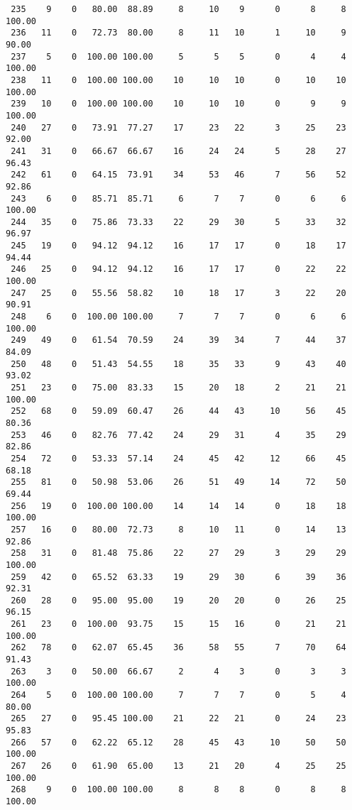 \begin{verbatim}
 235    9    0   80.00  88.89     8     10    9      0      8     8   100.00
 236   11    0   72.73  80.00     8     11   10      1     10     9    90.00
 237    5    0  100.00 100.00     5      5    5      0      4     4   100.00
 238   11    0  100.00 100.00    10     10   10      0     10    10   100.00
 239   10    0  100.00 100.00    10     10   10      0      9     9   100.00
 240   27    0   73.91  77.27    17     23   22      3     25    23    92.00
 241   31    0   66.67  66.67    16     24   24      5     28    27    96.43
 242   61    0   64.15  73.91    34     53   46      7     56    52    92.86
 243    6    0   85.71  85.71     6      7    7      0      6     6   100.00
 244   35    0   75.86  73.33    22     29   30      5     33    32    96.97
 245   19    0   94.12  94.12    16     17   17      0     18    17    94.44
 246   25    0   94.12  94.12    16     17   17      0     22    22   100.00
 247   25    0   55.56  58.82    10     18   17      3     22    20    90.91
 248    6    0  100.00 100.00     7      7    7      0      6     6   100.00
 249   49    0   61.54  70.59    24     39   34      7     44    37    84.09
 250   48    0   51.43  54.55    18     35   33      9     43    40    93.02
 251   23    0   75.00  83.33    15     20   18      2     21    21   100.00
 252   68    0   59.09  60.47    26     44   43     10     56    45    80.36
 253   46    0   82.76  77.42    24     29   31      4     35    29    82.86
 254   72    0   53.33  57.14    24     45   42     12     66    45    68.18
 255   81    0   50.98  53.06    26     51   49     14     72    50    69.44
 256   19    0  100.00 100.00    14     14   14      0     18    18   100.00
 257   16    0   80.00  72.73     8     10   11      0     14    13    92.86
 258   31    0   81.48  75.86    22     27   29      3     29    29   100.00
 259   42    0   65.52  63.33    19     29   30      6     39    36    92.31
 260   28    0   95.00  95.00    19     20   20      0     26    25    96.15
 261   23    0  100.00  93.75    15     15   16      0     21    21   100.00
 262   78    0   62.07  65.45    36     58   55      7     70    64    91.43
 263    3    0   50.00  66.67     2      4    3      0      3     3   100.00
 264    5    0  100.00 100.00     7      7    7      0      5     4    80.00
 265   27    0   95.45 100.00    21     22   21      0     24    23    95.83
 266   57    0   62.22  65.12    28     45   43     10     50    50   100.00
 267   26    0   61.90  65.00    13     21   20      4     25    25   100.00
 268    9    0  100.00 100.00     8      8    8      0      8     8   100.00

\end{verbatim}
